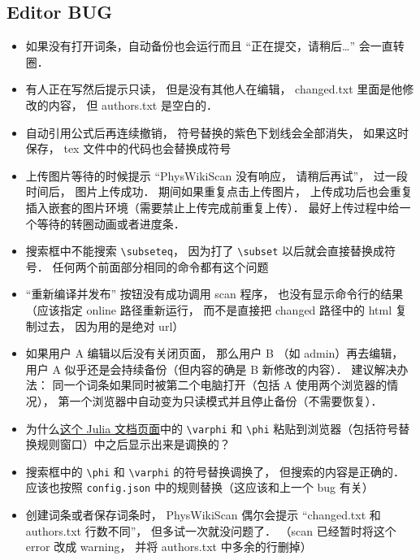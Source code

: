 
\subsection{Editor BUG}

\begin{itemize}
\item 如果没有打开词条，自动备份也会运行而且 “正在提交，请稍后…” 会一直转圈．

\item 有人正在写然后提示只读， 但是没有其他人在编辑， changed.txt 里面是他修改的内容， 但 authors.txt 是空白的．

\item 自动引用公式后再连续撤销， 符号替换的紫色下划线会全部消失， 如果这时保存， tex 文件中的代码也会替换成符号

\item 上传图片等待的时候提示 “PhysWikiScan 没有响应， 请稍后再试”， 过一段时间后， 图片上传成功． 期间如果重复点击上传图片， 上传成功后也会重复插入嵌套的图片环境（需要禁止上传完成前重复上传）． 最好上传过程中给一个等待的转圈动画或者进度条．

\item 搜索框中不能搜索 \lstinline|\subseteq|， 因为打了 \lstinline|\subset| 以后就会直接替换成符号． 任何两个前面部分相同的命令都有这个问题

\item “重新编译并发布” 按钮没有成功调用 scan 程序， 也没有显示命令行的结果（应该指定 online 路径重新运行， 而不是直接把 changed 路径中的 html 复制过去， 因为用的是绝对 url）

\item 如果用户 A 编辑以后没有关闭页面， 那么用户 B （如 admin）再去编辑， 用户 A 似乎还是会持续备份（但内容的确是 B 新修改的内容）． 建议解决办法： 同一个词条如果同时被第二个电脑打开（包括 A 使用两个浏览器的情况）， 第一个浏览器中自动变为只读模式并且停止备份（不需要恢复）．

\item 为什么\href{https://docs.julialang.org/en/v1/manual/unicode-input/}{这个 Julia 文档页面}中的 \lstinline|\varphi| 和 \lstinline|\phi| 粘贴到浏览器（包括符号替换规则窗口）中之后显示出来是调换的？

\item 搜索框中的 \lstinline|\phi| 和 \lstinline|\varphi| 的符号替换调换了， 但搜索的内容是正确的． 应该也按照 \lstinline|config.json| 中的规则替换（这应该和上一个 bug 有关）

\item 创建词条或者保存词条时， PhysWikiScan 偶尔会提示 “changed.txt 和 authors.txt 行数不同”， 但多试一次就没问题了． （scan 已经暂时将这个 error 改成 warning， 并将 authors.txt 中多余的行删掉）


\end{itemize}
